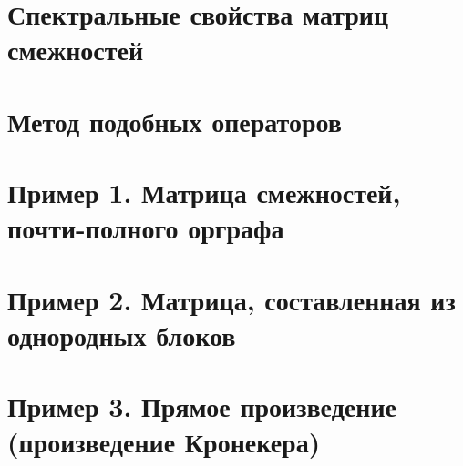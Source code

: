 \section*{Спектральные свойства матриц смежностей}

\section*{Метод подобных операторов}

\section*{Пример 1. Матрица смежностей, почти-полного орграфа}

\section*{Пример 2. Матрица, составленная из однородных блоков}

\section*{Пример 3. Прямое произведение (произведение Кронекера)}

